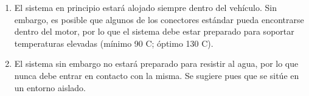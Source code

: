 \begin{enumerate}[resume, label=\textbf{\texttt{RNF-\arabic*}}]
  \item\label{nf:vehicle-env} El sistema en principio estará alojado siempre dentro
  del vehículo. Sin embargo, es posible que algunos de los conectores estándar
  pueda encontrarse dentro del motor, por lo que el sistema debe estar preparado para
  soportar temperaturas elevadas (mínimo 90 \textdegree C; óptimo 130 \textdegree C).
  \item\label{nf:water} El sistema sin embargo no estará preparado para resistir al
  agua, por lo que nunca debe entrar en contacto con la misma. Se sugiere pues que
  se sitúe en un entorno aislado.
\end{enumerate}